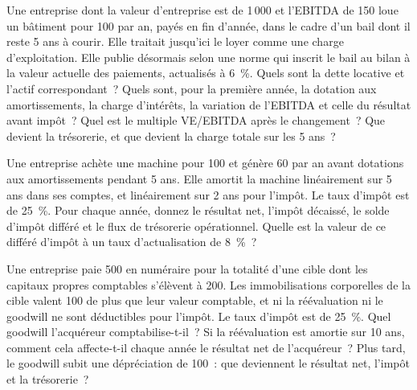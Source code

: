 \begin{question}\label{iq:iv2:valuation-and-financial-statements:19}
Une entreprise dont la valeur d'entreprise est de 1\,000 et l'EBITDA de 150 loue un bâtiment pour 100 par an, payés en fin d'année, dans le cadre d'un bail dont il reste 5 ans à courir. Elle traitait jusqu'ici le loyer comme une charge d'exploitation. Elle publie désormais selon une norme qui inscrit le bail au bilan à la valeur actuelle des paiements, actualisés à 6~\%. Quels sont la dette locative et l'actif correspondant~? Quels sont, pour la première année, la dotation aux amortissements, la charge d'intérêts, la variation de l'EBITDA et celle du résultat avant impôt~? Quel est le multiple VE/EBITDA après le changement~? Que devient la trésorerie, et que devient la charge totale sur les 5 ans~?
\end{question}

\begin{question}\label{iq:iv2:valuation-and-financial-statements:20}
Une entreprise achète une machine pour 100 et génère 60 par an avant dotations aux amortissements pendant 5 ans. Elle amortit la machine linéairement sur 5 ans dans ses comptes, et linéairement sur 2 ans pour l'impôt. Le taux d'impôt est de 25~\%. Pour chaque année, donnez le résultat net, l'impôt décaissé, le solde d'impôt différé et le flux de trésorerie opérationnel. Quelle est la valeur de ce différé d'impôt à un taux d'actualisation de 8~\%~?
\end{question}

\begin{question}\label{iq:iv2:valuation-and-financial-statements:21}
Une entreprise paie 500 en numéraire pour la totalité d'une cible dont les capitaux propres comptables s'élèvent à 200. Les immobilisations corporelles de la cible valent 100 de plus que leur valeur comptable, et ni la réévaluation ni le goodwill ne sont déductibles pour l'impôt. Le taux d'impôt est de 25~\%. Quel goodwill l'acquéreur comptabilise-t-il~? Si la réévaluation est amortie sur 10 ans, comment cela affecte-t-il chaque année le résultat net de l'acquéreur~? Plus tard, le goodwill subit une dépréciation de 100~: que deviennent le résultat net, l'impôt et la trésorerie~?
\end{question}

